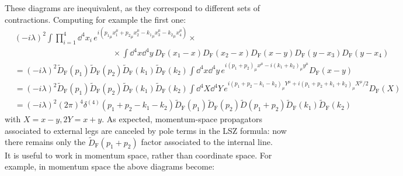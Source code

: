 These diagrams are inequivalent, as they correspond to different sets of contractions. Computing for example the first one:
\begin{equation*}
  \begin{split}
    & (-i \lambda)^2 \int \prod_{i = 1}^4 \dd^4x_i\, e^{i ({p_1}_\mu x_1^\mu + {p_2}_\mu x_2^\mu - {k_1}_\mu x_3^\mu - {k_2}_\mu x_4^\mu)} \times \\
    & \qquad \qquad \qquad \qquad \qquad \qquad \times \int \dd^4x \dd^4y\, D_\text{F}(x_1 - x) D_\text{F}(x_2 - x) D_\text{F}(x - y) D_\text{F}(y - x_3) D_\text{F}(y - x_4) \\
    & = (-i \lambda)^2 \tilde{D}_\text{F}(p_1) \tilde{D}_\text{F}(p_2) \tilde{D}_\text{F}(k_1) \tilde{D}_\text{F}(k_2) \int \dd^4x \dd^4y\, e^{i (p_1 + p_2)_\mu x^\mu - i (k_1 + k_2)_\mu y^\mu} D_\text{F}(x - y) \\
    & = (-i \lambda)^2 \tilde{D}_\text{F}(p_1) \tilde{D}_\text{F}(p_2) \tilde{D}_\text{F}(k_1) \tilde{D}_\text{F}(k_2) \int \dd^4X \dd^4Y\, e^{i (p_1 + p_2 - k_1 - k_2)_\mu Y^\mu + i (p_1 + p_2 + k_1 + k_2)_\mu X^\mu / 2} D_\text{F}(X) \\
    & = (-i \lambda)^2 (2\pi)^4 \delta^{(4)}(p_1 + p_2 - k_1 - k_2) \tilde{D}_\text{F}(p_1) \tilde{D}_\text{F}(p_2) \tilde{D}(p_1 + p_2) \tilde{D}_\text{F}(k_1) \tilde{D}_\text{F}(k_2)
  \end{split}
\end{equation*}
with $ X = x - y , 2Y = x + y $. As expected, momentum-space propagators associated to external legs are canceled by pole terms in the LSZ formula: now there remains only the $ \tilde{D}_\text{F}(p_1 + p_2) $ factor associated to the internal line. \\
It is useful to work in momentum space, rather than coordinate space. For example, in momentum space the above diagrams become:
